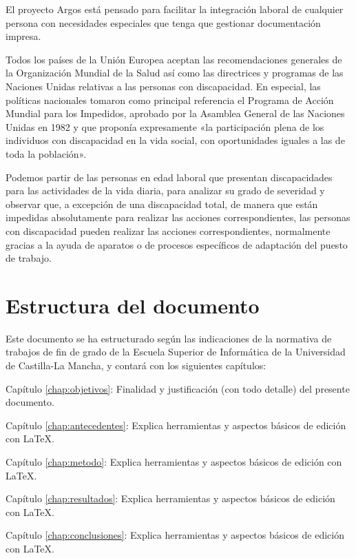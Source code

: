   El proyecto Argos está pensado para facilitar la integración laboral de cualquier persona con necesidades especiales que tenga que gestionar documentación impresa. 
  
  Todos los países de la Unión Europea aceptan las recomendaciones generales de la Organización Mundial de la Salud así como las directrices y programas de las Naciones Unidas relativas a las personas con discapacidad.  En especial, las políticas nacionales tomaron como principal referencia el Programa de Acción Mundial para los Impedidos, aprobado por la Asamblea General de las Naciones Unidas en 1982 y que proponía expresamente «la participación plena de los individuos con discapacidad en la vida social, con oportunidades iguales a las de toda la población». 

  Podemos partir de las personas en edad laboral que presentan discapacidades para las actividades de la vida diaria, para analizar su grado de severidad y observar que, a excepción de una discapacidad total, de manera que están impedidas absolutamente para realizar las acciones correspondientes, las personas con discapacidad pueden realizar las acciones correspondientes, normalmente gracias a la ayuda de aparatos o de procesos específicos de adaptación del puesto de trabajo.
  

 
  \section{Estructura del documento}

  Este documento se ha estructurado según las indicaciones de la normativa de trabajos de fin de grado de la Escuela Superior de Informática de la Universidad de Castilla-La Mancha, y contará con  los siguientes capítulos:
  \begin{definitionlist}
  \item[Capítulo \ref{chap:objetivos}: \nameref{chap:objetivos}] Finalidad y justificación  (con todo detalle) del presente documento.
  \item[Capítulo \ref{chap:antecedentes}: \nameref{chap:antecedentes}] Explica herramientas y aspectos básicos de edición con \LaTeX.
  \item[Capítulo \ref{chap:metodo}: \nameref{chap:metodo}] Explica herramientas y aspectos básicos de edición con \LaTeX.
  \item[Capítulo \ref{chap:resultados}: \nameref{chap:resultados}] Explica herramientas y aspectos básicos de edición con \LaTeX.
  \item[Capítulo \ref{chap:conclusiones}: \nameref{chap:conclusiones}] Explica herramientas y aspectos básicos de edición con \LaTeX.
  \end{definitionlist}



